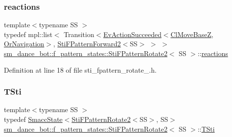 \subsubsection{\texorpdfstring{reactions}{reactions}}
{\footnotesize\ttfamily template$<$typename SS $>$ \\
typedef mpl\+::list$<$ Transition$<$\hyperlink{structsmacc_1_1default__events_1_1EvActionSucceeded}{Ev\+Action\+Succeeded}$<$\hyperlink{classcl__move__base__z_1_1ClMoveBaseZ}{Cl\+Move\+BaseZ}, \hyperlink{classsm__dance__bot_1_1OrNavigation}{Or\+Navigation}$>$, \hyperlink{classsm__dance__bot_1_1f__pattern__states_1_1StiFPatternForward2}{Sti\+F\+Pattern\+Forward2}$<$SS$>$ $>$ $>$ \hyperlink{classsm__dance__bot_1_1f__pattern__states_1_1StiFPatternRotate2}{sm\+\_\+dance\+\_\+bot\+::f\+\_\+pattern\+\_\+states\+::\+Sti\+F\+Pattern\+Rotate2}$<$ SS $>$\+::\hyperlink{classsm__dance__bot_1_1f__pattern__states_1_1StiFPatternRotate2_a89ab40aa874fa9b386c490af512ab0c0}{reactions}}



Definition at line 18 of file sti\+\_\+fpattern\+\_\+rotate\+\_.\+h.

\mbox{\label{classsm__dance__bot_1_1f__pattern__states_1_1StiFPatternRotate2_a38f721b63f2513b401cec57d938f7acf}} 
\subsubsection{\texorpdfstring{T\+Sti}{TSti}}
{\footnotesize\ttfamily template$<$typename SS $>$ \\
typedef \hyperlink{classSmaccState}{Smacc\+State}$<$\hyperlink{classsm__dance__bot_1_1f__pattern__states_1_1StiFPatternRotate2}{Sti\+F\+Pattern\+Rotate2}$<$SS$>$, SS$>$ \hyperlink{classsm__dance__bot_1_1f__pattern__states_1_1StiFPatternRotate2}{sm\+\_\+dance\+\_\+bot\+::f\+\_\+pattern\+\_\+states\+::\+Sti\+F\+Pattern\+Rotate2}$<$ SS $>$\+::\hyperlink{classsm__dance__bot_1_1f__pattern__states_1_1StiFPatternRotate2_a38f721b63f2513b401cec57d938f7acf}{T\+Sti}}



